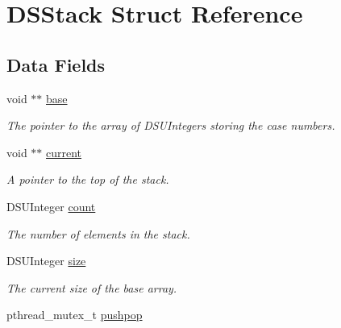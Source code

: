 \hypertarget{struct_d_s_stack}{
\section{DSStack Struct Reference}
\label{struct_d_s_stack}
}
\subsection*{Data Fields}
\begin{DoxyCompactItemize}
\item 
\hypertarget{struct_d_s_stack_a249441016c880f0801b380bd22cedcc6}{
void $\ast$$\ast$ \hyperlink{struct_d_s_stack_a249441016c880f0801b380bd22cedcc6}{base}}
\label{struct_d_s_stack_a249441016c880f0801b380bd22cedcc6}

\begin{DoxyCompactList}\small\item\em The pointer to the array of DSUIntegers storing the case numbers. \item\end{DoxyCompactList}\item 
\hypertarget{struct_d_s_stack_ab6c47e43f38d68ed97c3f6c7973d1444}{
void $\ast$$\ast$ \hyperlink{struct_d_s_stack_ab6c47e43f38d68ed97c3f6c7973d1444}{current}}
\label{struct_d_s_stack_ab6c47e43f38d68ed97c3f6c7973d1444}

\begin{DoxyCompactList}\small\item\em A pointer to the top of the stack. \item\end{DoxyCompactList}\item 
\hypertarget{struct_d_s_stack_a6e9cf56a395f2344f3c8b59e09d6ae69}{
DSUInteger \hyperlink{struct_d_s_stack_a6e9cf56a395f2344f3c8b59e09d6ae69}{count}}
\label{struct_d_s_stack_a6e9cf56a395f2344f3c8b59e09d6ae69}

\begin{DoxyCompactList}\small\item\em The number of elements in the stack. \item\end{DoxyCompactList}\item 
\hypertarget{struct_d_s_stack_ad8fde692241cfe9be893d63d9cc061a6}{
DSUInteger \hyperlink{struct_d_s_stack_ad8fde692241cfe9be893d63d9cc061a6}{size}}
\label{struct_d_s_stack_ad8fde692241cfe9be893d63d9cc061a6}

\begin{DoxyCompactList}\small\item\em The current size of the base array. \item\end{DoxyCompactList}\item 
\hypertarget{struct_d_s_stack_a7710776f2028c036203f5b6f77686749}{
pthread\_\-mutex\_\-t \hyperlink{struct_d_s_stack_a7710776f2028c036203f5b6f77686749}{pushpop}}
\label{struct_d_s_stack_a7710776f2028c036203f5b6f77686749}


\end{DoxyCompactItemize}
